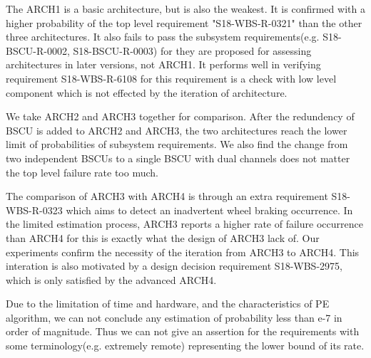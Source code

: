 The ARCH1 is a basic architecture, but is also the weakest. It is confirmed with a higher probability of the top level requirement "S18-WBS-R-0321" than the other three architectures. It also fails to pass the subsystem requirements(e.g. S18-BSCU-R-0002, S18-BSCU-R-0003) for they are proposed for assessing architectures in later versions, not ARCH1. It performs well in verifying requirement S18-WBS-R-6108 for this requirement is a check with low level component which is not effected by the iteration of architecture.

We take ARCH2 and ARCH3 together for comparison. After the redundency of BSCU is added to ARCH2 and ARCH3, the two architectures reach the lower limit of probabilities of subsystem requirements. We also find the change from two independent BSCUs to a single BSCU with dual channels does not matter the top level failure rate too much.

The comparison of ARCH3 with ARCH4 is through an extra requirement S18-WBS-R-0323 which aims to detect an inadvertent wheel braking occurrence. In the limited estimation process, ARCH3 reports a higher rate of failure occurrence than ARCH4 for this is exactly what the design of ARCH3 lack of. Our experiments confirm the necessity of the iteration from ARCH3 to ARCH4. This interation is also motivated by a design decision requirement S18-WBS-2975, which is only satisfied by the advanced ARCH4. 

Due to the limitation of time and hardware, and the characteristics of PE algorithm, we can not conclude any estimation of probability less than e-7 in order of magnitude. Thus we can not give an assertion for the requirements with some terminology(e.g. extremely remote) representing the lower bound of its rate.


